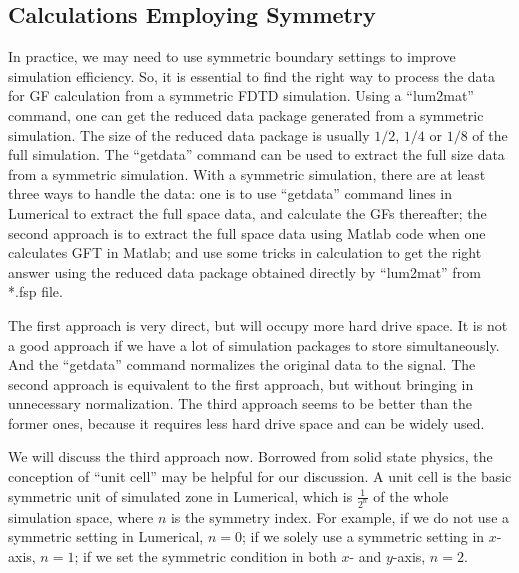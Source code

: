 \subsection{Calculations Employing Symmetry}
In practice, we may need to use symmetric boundary settings to improve simulation efficiency. So, it is essential to find the right way to process the data for GF calculation from a symmetric FDTD simulation. Using a ``lum2mat'' command, one can get the reduced data package generated from a symmetric simulation. The size of the reduced data package is usually $1/2$, $1/4$ or $1/8$ of the full simulation. The ``getdata'' command can be used to extract the full size data from a symmetric simulation. With a symmetric simulation, there are at least three ways to handle the data: one is to use ``getdata'' command lines in Lumerical to extract the full space data, and calculate the GFs thereafter; the second approach is to extract the full space data using Matlab code when one calculates GFT in Matlab; and use some tricks in calculation to get the right answer using the reduced data package obtained directly by ``lum2mat'' from *.fsp file.

The first approach is very direct, but will occupy more hard drive space. It is not a good approach if we have a lot of simulation packages to store simultaneously. And the ``getdata'' command normalizes the original data to the signal. The second approach is equivalent to the first approach, but without bringing in unnecessary normalization. The third approach seems to be better than the former ones, because it requires less hard drive space and can be widely used.

We will discuss the third approach now. Borrowed from solid state physics, the conception of ``unit cell'' may be helpful for our discussion. A unit cell is the basic symmetric unit of simulated zone in Lumerical, which is $\frac{1}{2^n}$ of the whole simulation space, where $n$ is the symmetry index. For example, if we do not use a symmetric setting in Lumerical, $n=0$; if we solely use a symmetric setting in $x$-axis, $n=1$; if we set the symmetric condition in both $x$- and $y$-axis, $n=2$.

